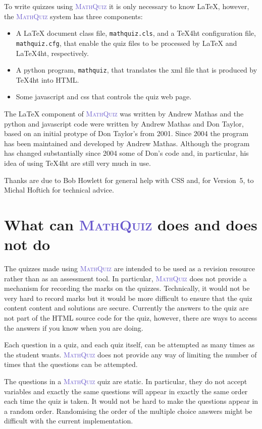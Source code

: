 \documentclass[svgnames]{article}
\def\MathQuiz{\textcolor{SlateBlue}{\textsc{MathQuiz}}\xspace}
\begin{document}
    To write quizzes using \MathQuiz it is only necessary to know
    \LaTeX, however, the \MathQuiz system has three components:
    \begin{itemize}
      \item A \LaTeX{} document class file, \texttt{mathquiz.cls}, and
      a \TeX 4ht configuration file, \texttt{mathquiz.cfg}, that enable the
      quiz files to be processed by \LaTeX{} and \LaTeX 4ht,
      respectively.
      \item A python program, \texttt{mathquiz}, that translates the xml
      file that is produced by \TeX 4ht into  HTML.
      \item Some javascript and css that controls the quiz web page.
    \end{itemize}

   The \LaTeX{} component of \MathQuiz{} was written by Andrew Mathas
   and the python and javascript code were written by Andrew Mathas and
   Don Taylor, based on an initial protype of Don Taylor's from 2001.
   Since 2004 the program has been maintained and developed by Andrew
   Mathas. Although the program has changed substantially since 2004
   some of Don's code and, in particular, his idea of using \TeX 4ht are
   still very much in use.

   Thanks are due to Bob Howlett for general help with CSS and, for
   Version~5, to  Michal Hoftich for technical advice.

  \section{What can \MathQuiz does and does not do}

    The quizzes made using \MathQuiz are intended to be used as a
    revision resource rather than as an assessment tool. In particular,
    \MathQuiz does not provide a mechanism for recording the marks on
    the quizzes. Technically, it would not be very hard to record marks
    but it would be more difficult to ensure that the quiz content
    content and solutions are secure. Currently the answers to the quiz
    are not part of the HTML source code for the quiz, however, there
    are ways to access the answers if you know when you are doing.

    Each question in a quiz, and each quiz itself, can be attempted as
    many times as the student wants. \MathQuiz does not provide any way
    of limiting the number of times that the questions can be attempted.

    The questions in a \MathQuiz quiz are static. In particular, they do
    not accept variables and exactly the same questions will appear in
    exactly the same order each time the quiz is taken. It would not be
    hard to make the questions appear in a random order. Randomising the
    order of the multiple choice answers might be difficult with the
    current implementation.
\end{document}
